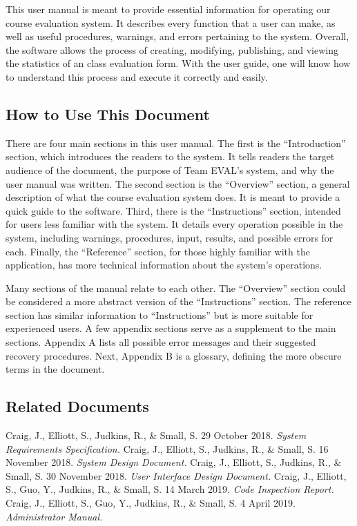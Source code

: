 \documentclass{article}
\begin{document}
This user manual is meant to provide essential information for operating our course evaluation system. It describes every function that a user can make, as well as useful procedures, warnings, and errors pertaining to the system. Overall, the software allows the process of creating, modifying, publishing, and viewing the statistics of an class evaluation form. With the user guide, one will know how to understand this process and execute it correctly and easily.

\subsection{How to Use This Document}

There are four main sections in this user manual. The first is the ``Introduction'' section, which introduces the readers to the system. It tells readers the target audience of the document, the purpose of Team EVAL's system, and why the user manual was written. The second section is the ``Overview'' section, a general description of what the course evaluation system does. It is meant to provide a quick guide to the software. Third, there is the ``Instructions'' section, intended for users less familiar with the system. It details every operation possible in the system, including warnings, procedures, input, results, and possible errors for each. Finally, the ``Reference'' section, for those highly familiar with the application, has more technical information about the system's operations.

Many sections of the manual relate to each other. The ``Overview'' section could be considered a more abstract version of the ``Instructions'' section. The reference section has similar information to ``Instructions'' but is more suitable for experienced users. A few appendix sections serve as a supplement to the main sections. Appendix A lists all possible error messages and their suggested recovery procedures. Next, Appendix B is a glossary, defining the more obscure terms in the document.

\subsection{Related Documents}

Craig, J., Elliott, S., Judkins, R., \& Small, S. 29 October 2018. \textit{System Requirements Specification.}
\vspace{3mm}\newline
Craig, J., Elliott, S., Judkins, R., \& Small, S. 16 November 2018. \textit{System Design Document.}
\vspace{3mm}\newline
Craig, J., Elliott, S., Judkins, R., \& Small, S. 30 November 2018. \textit{User Interface Design Document.}
\vspace{3mm}\newline
Craig, J., Elliott, S., Guo, Y., Judkins, R., \& Small, S. 14 March 2019. \textit{Code Inspection Report.}
\vspace{3mm}\newline
Craig, J., Elliott, S., Guo, Y., Judkins, R., \& Small, S. 4 April 2019. \textit{Administrator Manual.}
\end{document}
